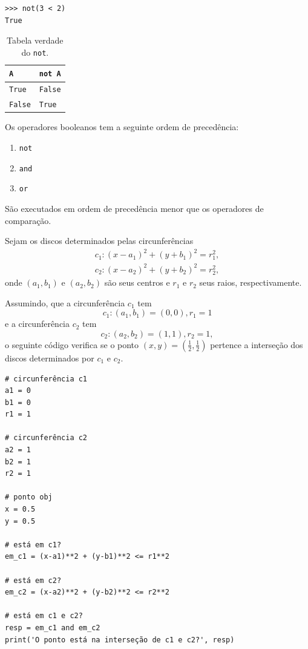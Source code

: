 \begin{itemize}
\begin{lstlisting}
>>> not(3 < 2)
True
\end{lstlisting}

  \begin{table}[H]
    \centering
    \caption{Tabela verdade do \lstinline+not+.}
    \begin{tabular}{l|l}
      {\lstinline+A+}     & {\lstinline+not A+} \\\hline
      {\lstinline+True+}  & {\lstinline+False+} \\
      {\lstinline+False+} & {\lstinline+True+} \\\hline
    \end{tabular}
  \end{table}  
\end{itemize}

\begin{obs}
  Os operadores booleanos tem a seguinte ordem de precedência:
  \begin{enumerate}[1.]
  \item \lstinline+not+
  \item \lstinline+and+
  \item \lstinline+or+
  \end{enumerate}
  São executados em ordem de precedência menor que os operadores de comparação.
\end{obs}

\begin{ex}
  Sejam os discos determinados pelas circunferências
  \begin{gather}
    c_1: (x - a_1)^2 + (y + b_1)^2 = r_1^2,\\
    c_2: (x - a_2)^2 + (y + b_2)^2 = r_2^2,
  \end{gather}
  onde $(a_1, b_1)$ e $(a_2, b_2)$ são seus centros e $r_1$ e $r_2$ seus raios, respectivamente.

  Assumindo, que a circunferência $c_1$ tem
  \begin{equation}
    c_1: (a_1, b_1) = (0, 0), r_1 = 1
  \end{equation}
  e a circunferência $c_2$ tem
  \begin{equation}
    c_2: (a_2, b_2) = (1, 1), r_2 = 1,
  \end{equation}
  o seguinte código verifica se o ponto $(x, y) = \left(\frac{1}{2}, \frac{1}{2}\right)$ pertence a interseção dos discos determinados por $c_1$ e $c_2$.

\begin{lstlisting}
# circunferência c1
a1 = 0
b1 = 0
r1 = 1

# circunferência c2
a2 = 1
b2 = 1
r2 = 1

# ponto obj
x = 0.5
y = 0.5

# está em c1?
em_c1 = (x-a1)**2 + (y-b1)**2 <= r1**2

# está em c2?
em_c2 = (x-a2)**2 + (y-b2)**2 <= r2**2

# está em c1 e c2?
resp = em_c1 and em_c2
print('O ponto está na interseção de c1 e c2?', resp)
\end{lstlisting}
\end{ex}


